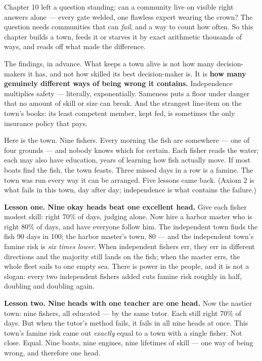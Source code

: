 
Chapter 10 left a question standing: can a community live on visible
right answers alone --- every gate welded, one flawless expert wearing
the crown? The question needs communities that can \emph{fail}, and a
way to count how often. So this chapter builds a town, feeds it or
starves it by exact arithmetic thousands of ways, and reads off what
made the difference.

The findings, in advance. What keeps a town alive is not how many
decision-makers it has, and not how skilled its best decision-maker
is. It is \textbf{how many genuinely different ways of being wrong it
contains.} Independence multiplies safety --- literally, exponentially.
Sameness puts a floor under danger that no amount of skill or size can
break. And the strangest line-item on the town's books: its least
competent member, kept fed, is sometimes the only insurance policy
that pays.


Here is the town. Nine fishers. Every morning the fish are somewhere ---
one of four grounds --- and nobody knows which for certain. Each fisher
reads the water; each may also have education, years of learning how
fish actually move. If most boats find the fish, the town feasts.
Three missed days in a row is a famine. The town was run every way it
can be arranged. Five lessons came back. (Axiom 2 is what fails in this town, day
after day; independence is what contains the failure.)

\textbf{Lesson one. Nine okay heads beat one excellent head.} Give each
fisher modest skill: right 70\% of days, judging alone. Now hire a
harbor master who is right 80\% of days, and have everyone follow him.
The independent town finds the fish 90 days in 100; the harbor
master's town, 80 --- and the independent town's famine risk is \emph{six
times lower}. When independent fishers err, they err in different
directions and the majority still lands on the fish; when the master
errs, the whole fleet sails to one empty sea. There is power in the
people, and it is not a slogan: every two independent fishers added
cuts famine risk roughly in half, doubling and doubling again.


\textbf{Lesson two. Nine heads with one teacher are one head.} Now the
nastier town: nine fishers, all educated --- by the same tutor. Each
still right 70\% of days. But when the tutor's method fails, it fails
in all nine heads at once. This town's famine risk came out \emph{exactly}
equal to a town with a single fisher. Not close. Equal. Nine boats,
nine engines, nine lifetimes of skill --- one way of being wrong, and
therefore one head.

